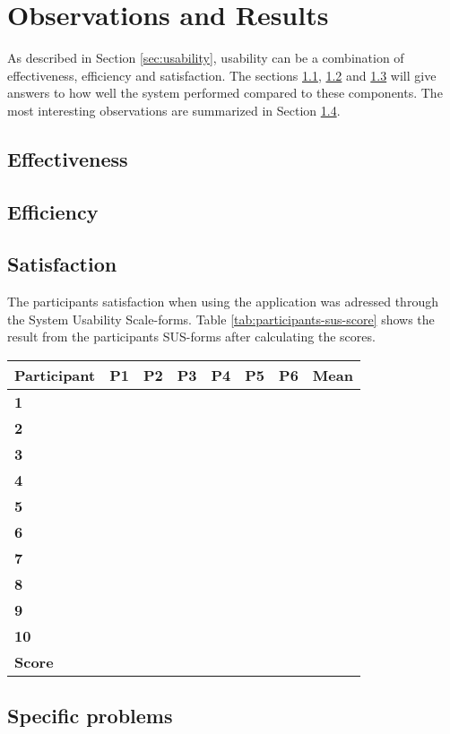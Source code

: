 \section{Observations and Results}

As described in Section \ref{sec:usability}, usability can be a combination of effectiveness, efficiency and satisfaction. The sections \ref{subsec:effectiveness}, \ref{subsec:efficiency} and \ref{subsec:satisfaction} will give answers to how well the system performed compared to these components. The most interesting observations are summarized in Section \ref{subsec:specificproblems}.

\subsection{Effectiveness}
\label{subsec:effectiveness}


\subsection{Efficiency}
\label{subsec:efficiency}


\subsection{Satisfaction}
\label{subsec:satisfaction}

The participants satisfaction when using the application was adressed through the System Usability Scale-forms. Table \ref{tab:participants-sus-score} shows the result from the participants SUS-forms after calculating the scores.

\begin{center}
	\begin{tabular}{| p{2.5cm} | p{1.5cm} | p{1.5cm} | p{1.5cm} | p{1.5cm} | p{1.5cm} | p{1.5cm} | p{1.5cm} | }
	\label{tab:participants-sus-score}
	\hline
	\textbf{Participant} & P1 & P2 & P3 & P4 & P5 & P6 & Mean \\ \hline
	\textbf{1} & & & & & & & \\ \hline
	\textbf{2} & & & & & & & \\ \hline
	\textbf{3} & & & & & & & \\ \hline
	\textbf{4} & & & & & & & \\ \hline
	\textbf{5} & & & & & & & \\ \hline
	\textbf{6} & & & & & & & \\ \hline
	\textbf{7} & & & & & & & \\ \hline
	\textbf{8} & & & & & & & \\ \hline
	\textbf{9} & & & & & & & \\ \hline
	\textbf{10} & & & & & & & \\ \hline
	\textbf{Score} & & & & & & & \\ \hline
	\end{tabular}
\end{center}


\subsection{Specific problems}
\label{subsec:specificproblems}
